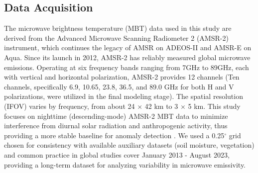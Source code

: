 \documentclass[fleqn,10pt]{wlscirep_mdpi_style}
\begin{document}
\subsection{Data Acquisition}
The microwave brightness temperature (MBT) data used in this study are derived from the Advanced Microwave Scanning Radiometer 2 (AMSR-2) instrument, which continues the legacy of AMSR on ADEOS-II and AMSR-E on Aqua. Since its launch in 2012, AMSR-2 has reliably measured global microwave emissions\cite{kasaharaStatusAMSR22012}. Operating at six frequency bands ranging from 7GHz to 89GHz, each with vertical and horizontal polarization, AMSR-2 provides 12 channels (Ten channels, specifically 6.9, 10.65, 23.8, 36.5, and 89.0 GHz for both H and V polarizations, were utilized in the final modeling stage). %
The spatial resolution (IFOV) varies by frequency, from about 24 $\times$ 42 km to 3 $\times$ 5 km\cite{kachiStatusGCOMW1AMSR22008}. This study focuses on nighttime (descending-mode) AMSR-2 MBT data to minimize interference from diurnal solar radiation and anthropogenic activity, thus providing a more stable baseline for anomaly detection \cite{maedaDiscriminationLocalFaint2008}. We used a 0.25$^{\circ}$ grid chosen for consistency with available auxiliary datasets (soil moisture, vegetation) and common practice in global studies \cite{njokuRetrievalLandSurface1999,wuIdentifyingSeismicAnomalies2024} cover January 2013 - August 2023, providing a long-term dataset for analyzing variability in microwave emissivity.
\end{document}
